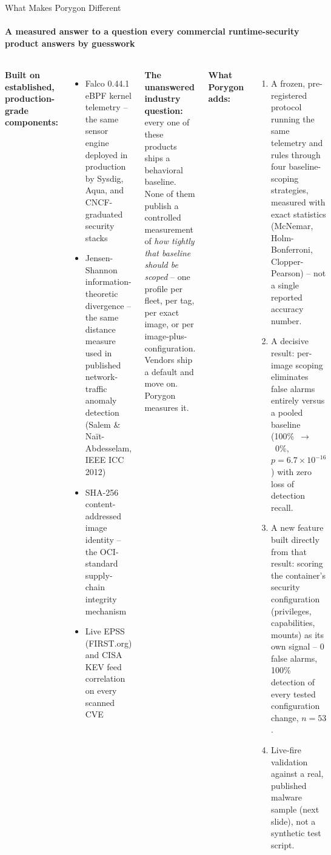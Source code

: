 \documentclass[aspectratio=169, 11pt]{beamer}
\begin{document}
\begin{frame}{What Makes Porygon Different}
\framesubtitle{A measured answer to a question every commercial runtime-security product answers by guesswork}

\begin{columns}[T]
\footnotesize
\textbf{Built on established, production-grade components:}
\begin{itemize}\setlength\itemsep{2pt}
  \item Falco 0.44.1 eBPF kernel telemetry -- the same sensor engine
        deployed in production by Sysdig, Aqua, and CNCF-graduated
        security stacks
  \item Jensen-Shannon information-theoretic divergence -- the same
        distance measure used in published network-traffic anomaly
        detection (Salem \& Naït-Abdesselam, IEEE ICC 2012)
  \item SHA-256 content-addressed image identity -- the OCI-standard
        supply-chain integrity mechanism
  \item Live EPSS (FIRST.org) and CISA KEV feed correlation on every
        scanned CVE
\end{itemize}

\medskip
\textbf{The unanswered industry question:} every one of these products
ships a behavioral baseline. None of them publish a controlled measurement
of \emph{how tightly that baseline should be scoped} -- one profile per
fleet, per tag, per exact image, or per image-plus-configuration. Vendors
ship a default and move on. Porygon measures it.

\footnotesize
\textbf{What Porygon adds:}
\begin{enumerate}\setlength\itemsep{2pt}
  \item A frozen, pre-registered protocol running the same telemetry and
        rules through four baseline-scoping strategies, measured with
        exact statistics (McNemar, Holm-Bonferroni, Clopper-Pearson) --
        not a single reported accuracy number.
  \item A decisive result: per-image scoping eliminates false alarms
        entirely versus a pooled baseline (100\%~$\to$~0\%,
        $p=6.7\times10^{-16}$) with zero loss of detection recall.
  \item A new feature built directly from that result: scoring the
        container's security configuration (privileges, capabilities,
        mounts) as its own signal -- 0 false alarms, 100\% detection
        of every tested configuration change, $n=53$.
  \item Live-fire validation against a real, published malware sample
        (next slide), not a synthetic test script.
\end{enumerate}
\end{columns}
\end{frame}
\end{document}
